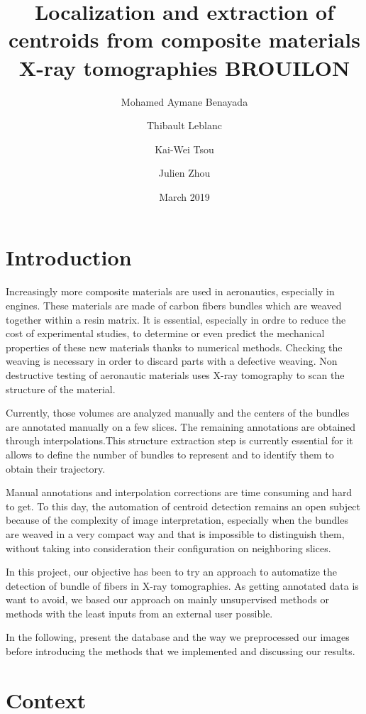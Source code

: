 \documentclass{report}
\title{Localization and extraction of centroids from composite materials X-ray tomographies BROUILON}
\author{Mohamed Aymane Benayada \and Thibault Leblanc \and Kai-Wei Tsou \and Julien Zhou}
\date{March 2019}
\begin{document}
 
\maketitle

\tableofcontents


\chapter{Introduction}
 
Increasingly more composite materials are used in aeronautics, especially in engines. These materials are made of 	carbon fibers bundles which are weaved together within a resin matrix. It is essential, especially in ordre to reduce the cost of experimental studies, to determine or even predict the mechanical properties of these new materials thanks to numerical methods. Checking the weaving is necessary in order to discard parts with a defective weaving. Non destructive testing of aeronautic materials uses X-ray tomography to scan the structure of the material.


Currently, those volumes are analyzed manually and the centers of the bundles are annotated manually on a few slices. The remaining annotations are obtained through interpolations.This structure extraction step is currently essential for it allows to define the number of bundles to represent and to identify them to obtain their trajectory.


Manual annotations and interpolation corrections are time consuming and hard to get. To this day, the automation of centroid detection remains an open subject because of the complexity of image interpretation, especially when the bundles are weaved in a very compact way and that is impossible to distinguish them, without taking into consideration their configuration on neighboring slices.\newline

In this project, our objective has been to try an approach to automatize the detection of bundle of fibers in X-ray tomographies. As getting annotated data is want to avoid, we based our approach on mainly unsupervised methods or methods with the least inputs from an external user possible.

In the following, present the database and the way we preprocessed our images before introducing the methods that we implemented and discussing our results.

\chapter{Context}
\end{document}
